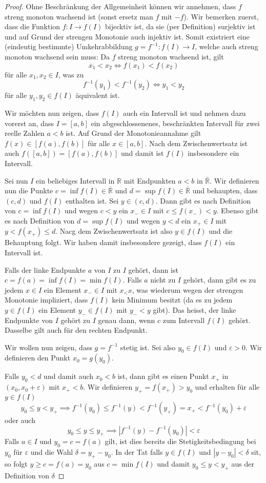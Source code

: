 \documentclass[../Analysis1_script.tex]{subfiles}
\begin{document}
\begin{proof}
	Ohne Beschränkung der Allgemeinheit können wir annehmen, dass $f$ streng monoton wachsend ist (sonst ersetz man $f$ mit $-f$). Wir bemerken zuerst, dass die Funktion $f: I \to f(I)$ bijecktiv ist, da sie (per Definition) surjektiv ist und auf Grund der strengen Monotonie auch injektiv ist. Somit existriert eine (eindeutig bestimmte) Umkehrabbildung $g = f^{-1} : f(I) \to I$, welche auch streng monoton wachsend sein muss: Da $f$ streng monoton wachsend ist, gilt 
	\[x_1 < x_2 \iff f(x_1) < f(x_2)\]
	für alle $x_1, x_2 \in I$, was zu 
	\[f^{-1}(y_1) < f^{-1}(y_2) \iff y_1 < y_2\]
	für alle $y_1, y_2 \in f(I)$ äquivalent ist.
	
	Wir möchten nun zeigen, dass $f(I)$ auch ein Intervall ist und nehmen dazu vorerst an, dass $I = [a, b]$ ein abgeschlossenenes, beschränkten Intervall für zwei reelle Zahlen $a < b$ ist. Auf Grund der Monotonieannahme gilt $f(x) \in [f(a), f(b)]$ für alle $x \in [a, b]$. Nach dem Zwischenwertsatz ist auch $f([a, b]) = [f(a), f(b)]$ und damit ist $f(I)$ insbesondere ein Intervall.
	
	Sei nun $I$ ein beliebiges Intervall in $\mathbb{R}$ mit Endpunkten $a < b$ in $\bar{\mathbb{R}}$. Wir definieren nun die Punkte $c = \inf{f(I)} \in \bar{\mathbb{R}}$ und $d = \sup{f(I)} \in \bar{\mathbb{R}}$ und behaupten, dass $(c, d)$ und $f(I)$ enthalten ist. Sei $y \in (c, d)$. Dann gibt es nach Definition von $c = \inf{f(I)}$ und wegen $c < y$ ein $x_- \in I$ mit $c \leq f(x_-) < y$. Ebenso gibt es nach Definition von $d = \sup{f(I)}$ und wegen $y < d$ ein $x_{+} \in I$ mit $y < f(x_{+}) \leq d$. Nacg dem Zwischenwertsatz ist also $y \in f(I)$ und die Behauptung folgt. Wir haben damit insbesondere gezeigt, dass $f(I)$ ein Intervall ist.
	
	Falls der linke Endpunkte $a$ von $I$ zu $I$ gehört, dann ist $c = f(a) = \inf{f(I)} = \min{f(I)}$. Falls $a$ nicht zu $I$ gehört, dann gibt es zu jedem $x \in I$ ein Element $x_- \in I$ mit $x_ < x$, was wiederum wegen der strengen Monotonie impliziert, dass $f(I)$ kein Minimum besitzt (da es zu jedem $y \in f(I)$ ein Element $y_- \in f(I)$ mit $y_- < y$ gibt). Das heisst, der linke Endpunkte von $I$ gehört zu $I$ genau dann, wenn $c$ zum Intervall $f(I)$ gehört. Dasselbe gilt auch für den rechten Endpunkt.
	
	Wir wollen nun zeigen, dass $g = f^{-1}$ stetig ist. Sei also $y_0 \in f(I)$ und $\varepsilon > 0$. Wir definieren den Punkt $x_0 = g(y_0)$.
	
	Falls $y_0 < d$ und damit auch $x_0 < b$ ist, dann gibt es einen Punkt $x_+$ in $(x_0, x_0 + \varepsilon)$ mit $x_+ < b$. Wir definieren $y_+ = f(x_+) > y_0$ und erhalten für alle $y \in f(I)$
	\[y_0 \leq y < y_+ \implies f^{-1}(y_0) \leq f^{-1}(y) < f^{-1}(y_+) = x_+ < f^{-1}(y_0) + \varepsilon\]
	oder auch
	\[y_0 \leq y \leq y_+ \implies |f^{-1}(y) - f^{-1}(y_0)| < \varepsilon\]
	Falls $a \in I$ und $y_0 = c = f(a)$ gilt, ist dies bereits die Stetigkeitsbedingung bei $y_0$ für $\varepsilon$ und die Wahl $\delta = y_+ - y_0$. In der Tat falls $y \in f(I)$ und $|y- y_0| < \delta$ sit, so folgt $y \geq c = f(a) = y_0$ aus $c = \min{f(I)}$ und damit $y_0 \leq y < y_+$ aus der Definition von $\delta$
	

\end{proof}
\end{document}
